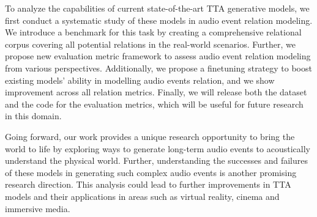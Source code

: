 To analyze the capabilities of current state-of-the-art TTA generative models, we first conduct a systematic study of these models in audio event relation modeling. We introduce a benchmark for this task by creating a comprehensive relational corpus covering all potential relations in the real-world scenarios. Further, we propose new evaluation metric framework to assess audio event relation modeling from various perspectives. Additionally, we propose a finetuning strategy to boost existing models' ability in modelling audio events relation, and we show improvement across all relation metrics. Finally, we will release both the dataset and the code for the evaluation metrics, which will be useful for future research in this domain.

Going forward, our work provides a unique research opportunity to bring the world to life by exploring ways to generate long-term audio events to acoustically understand the physical world. Further, understanding the successes and failures of these models in generating such complex audio events is another promising research direction. This analysis could lead to further improvements in TTA models and their applications in areas such as virtual reality, cinema and immersive media. 
\newpage

